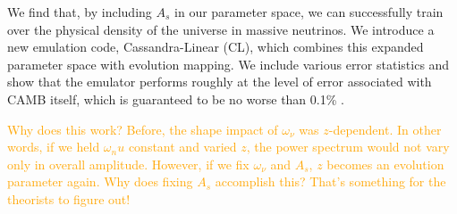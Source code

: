 We find that, by including $A_s$ in our parameter space, we can successfully 
train over the physical density of the universe in massive neutrinos. We 
introduce a new emulation code, Cassandra-Linear (CL), which combines this 
expanded parameter space with evolution
mapping. We include various error statistics and show that the emulator
performs roughly at the level of error associated with CAMB itself, which is
guaranteed to be no worse than 0.1\% .

\textcolor{orange}{Why does this work? Before, the shape impact of
$\omega_\nu$ 
was $z$-dependent. In other words, if we held $\omega_nu$ constant and varied
$z$, the power spectrum would not vary only in overall amplitude. However, if
we fix $\omega_\nu$ and $A_s$, $z$ becomes an evolution parameter again. Why
does fixing $A_s$ accomplish this? That's something for the theorists to 
figure out!}
